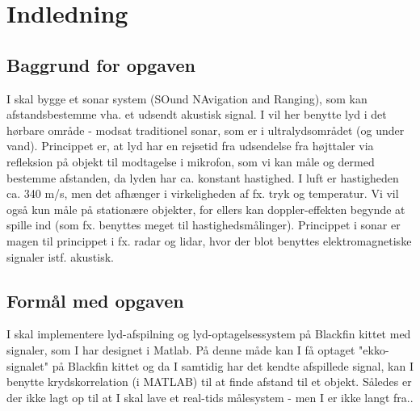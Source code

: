 \graphicspath{{Chapters/Indledning/}}

\chapter{Indledning}

\section{Baggrund for opgaven}
I skal bygge et sonar system (SOund NAvigation and Ranging), som kan afstandsbestemme vha. et udsendt akustisk signal. I vil her benytte lyd i det hørbare område - modsat traditionel sonar, som er i ultralydsområdet (og under vand).
Princippet er, at lyd har en rejsetid fra udsendelse fra højttaler via refleksion på objekt til modtagelse i mikrofon, som vi kan måle og dermed bestemme afstanden, da lyden har ca. konstant hastighed. I luft er hastigheden ca. 340 m/s, men det afhænger i virkeligheden af fx. tryk og temperatur. Vi vil også kun måle på stationære objekter, for ellers kan doppler-effekten begynde at spille ind (som fx. benyttes meget til hastighedsmålinger). Princippet i sonar er magen til princippet i fx. radar og lidar, hvor der blot benyttes elektromagnetiske signaler istf. akustisk.

\section{Formål med opgaven}
I skal implementere lyd-afspilning og lyd-optagelsessystem på Blackfin kittet med signaler, som I har designet i Matlab. På denne måde kan I få optaget "ekko-signalet" på Blackfin kittet og da I samtidig har det kendte afspillede signal, kan I benytte krydskorrelation (i MATLAB) til at finde afstand til et objekt. Således er der ikke lagt op til at I skal lave et real-tids målesystem - men I er ikke langt fra..